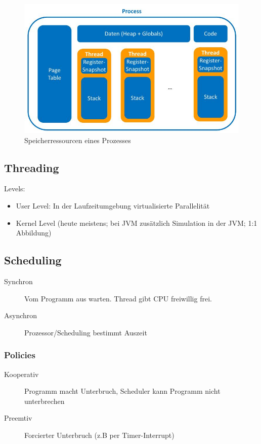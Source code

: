 \begin{figure}[h]
	\centering
	\includegraphics[width=0.7\linewidth]{img/prozess_speicherressourcen}
	\caption{Speicherressourcen eines Prozesses}
	\label{fig:prozessspeicherressourcen}
\end{figure}

\subsection{Threading}
Levels:
\begin{itemize}
	\item User Level: In der Laufzeitumgebung virtualisierte Parallelität
	\item Kernel Level (heute meistens; bei JVM zusätzlich Simulation in der JVM; 1:1 Abbildung)
\end{itemize}


\subsection{Scheduling}
\begin{description}
	\item[Synchron] Vom Programm aus warten. Thread gibt CPU freiwillig frei.
	\item[Asynchron] Prozessor/Scheduling bestimmt Auszeit
\end{description}


\subsubsection{Policies}

\begin{description}
	\item[Kooperativ] Programm macht Unterbruch, Scheduler kann Programm nicht unterbrechen
	\item[Preemtiv] Forcierter Unterbruch (z.B per Timer-Interrupt)
\end{description}

